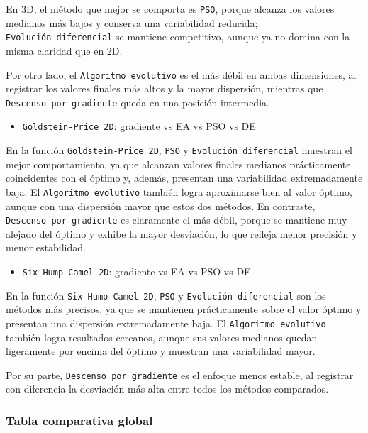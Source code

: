 \documentclass[
  12pt,
  letterpaper,
  DIV=11,
  numbers=noendperiod]{scrartcl}
\providecommand{\tightlist}{%
  \setlength{\itemsep}{0pt}\setlength{\parskip}{0pt}}
\begin{document}
En 3D, el método que mejor se comporta es \texttt{PSO}, porque alcanza
los valores medianos más bajos y conserva una variabilidad reducida;
\texttt{Evolución\ diferencial} se mantiene competitivo, aunque ya no
domina con la misma claridad que en 2D.

Por otro lado, el \texttt{Algoritmo\ evolutivo} es el más débil en ambas
dimensiones, al registrar los valores finales más altos y la mayor
dispersión, mientras que \texttt{Descenso\ por\ gradiente} queda en una
posición intermedia.

\begin{itemize}
\tightlist
\item
  \texttt{Goldstein-Price\ 2D}: gradiente vs EA vs PSO vs DE
\end{itemize}

En la función \texttt{Goldstein-Price\ 2D}, \texttt{PSO} y
\texttt{Evolución\ diferencial} muestran el mejor comportamiento, ya que
alcanzan valores finales medianos prácticamente coincidentes con el
óptimo y, además, presentan una variabilidad extremadamente baja. El
\texttt{Algoritmo\ evolutivo} también logra aproximarse bien al valor
óptimo, aunque con una dispersión mayor que estos dos métodos. En
contraste, \texttt{Descenso\ por\ gradiente} es claramente el más débil,
porque se mantiene muy alejado del óptimo y exhibe la mayor desviación,
lo que refleja menor precisión y menor estabilidad.

\begin{itemize}
\tightlist
\item
  \texttt{Six-Hump\ Camel\ 2D}: gradiente vs EA vs PSO vs DE
\end{itemize}

En la función \texttt{Six-Hump\ Camel\ 2D}, \texttt{PSO} y
\texttt{Evolución\ diferencial} son los métodos más precisos, ya que se
mantienen prácticamente sobre el valor óptimo y presentan una dispersión
extremadamente baja. El \texttt{Algoritmo\ evolutivo} también logra
resultados cercanos, aunque sus valores medianos quedan ligeramente por
encima del óptimo y muestran una variabilidad mayor.

Por su parte, \texttt{Descenso\ por\ gradiente} es el enfoque menos
estable, al registrar con diferencia la desviación más alta entre todos
los métodos comparados.

\subsubsection{Tabla comparativa global}\label{tabla-comparativa-global}
\end{document}
